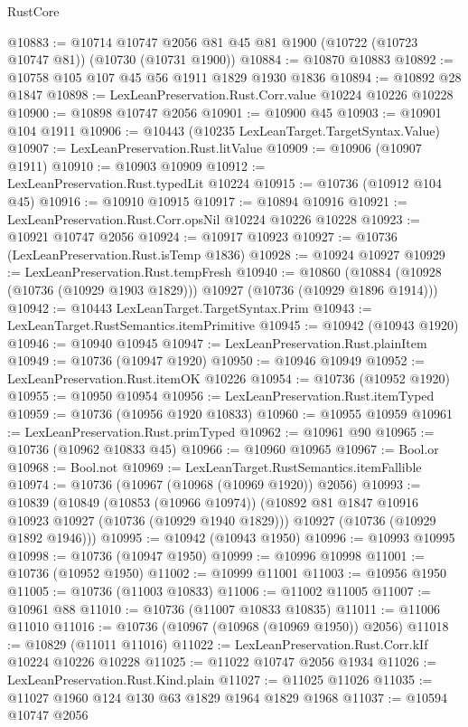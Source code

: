 \begin{lexlean}{RustCore}
\begin{coremodule}
@10883 := @10714 @10747 @2056 @81 @45 @81 @1900 (@10722 (@10723 @10747 @81)) (@10730 (@10731 @1900))
@10884 := @10870 @10883
@10892 := @10758 @105 @107 @45 @56 @1911 @1829 @1930 @1836
@10894 := @10892 @28 @1847
@10898 := LexLeanPreservation.Rust.Corr.value @10224 @10226 @10228
@10900 := @10898 @10747 @2056
@10901 := @10900 @45
@10903 := @10901 @104 @1911
@10906 := @10443 (@10235 LexLeanTarget.TargetSyntax.Value)
@10907 := LexLeanPreservation.Rust.litValue
@10909 := @10906 (@10907 @1911)
@10910 := @10903 @10909
@10912 := LexLeanPreservation.Rust.typedLit @10224
@10915 := @10736 (@10912 @104 @45)
@10916 := @10910 @10915
@10917 := @10894 @10916
@10921 := LexLeanPreservation.Rust.Corr.opsNil @10224 @10226 @10228
@10923 := @10921 @10747 @2056
@10924 := @10917 @10923
@10927 := @10736 (LexLeanPreservation.Rust.isTemp @1836)
@10928 := @10924 @10927
@10929 := LexLeanPreservation.Rust.tempFresh
@10940 := @10860
    (@10884 (@10928 (@10736 (@10929 @1903 @1829))) @10927 (@10736 (@10929 @1896 @1914)))
@10942 := @10443 LexLeanTarget.TargetSyntax.Prim
@10943 := LexLeanTarget.RustSemantics.itemPrimitive
@10945 := @10942 (@10943 @1920)
@10946 := @10940 @10945
@10947 := LexLeanPreservation.Rust.plainItem
@10949 := @10736 (@10947 @1920)
@10950 := @10946 @10949
@10952 := LexLeanPreservation.Rust.itemOK @10226
@10954 := @10736 (@10952 @1920)
@10955 := @10950 @10954
@10956 := LexLeanPreservation.Rust.itemTyped
@10959 := @10736 (@10956 @1920 @10833)
@10960 := @10955 @10959
@10961 := LexLeanPreservation.Rust.primTyped
@10962 := @10961 @90
@10965 := @10736 (@10962 @10833 @45)
@10966 := @10960 @10965
@10967 := Bool.or
@10968 := Bool.not
@10969 := LexLeanTarget.RustSemantics.itemFallible
@10974 := @10736 (@10967 (@10968 (@10969 @1920)) @2056)
@10993 := @10839
    (@10849
      (@10853 (@10966 @10974))
      (@10892 @81 @1847 @10916 @10923 @10927 (@10736 (@10929 @1940 @1829)))
      @10927
      (@10736 (@10929 @1892 @1946)))
@10995 := @10942 (@10943 @1950)
@10996 := @10993 @10995
@10998 := @10736 (@10947 @1950)
@10999 := @10996 @10998
@11001 := @10736 (@10952 @1950)
@11002 := @10999 @11001
@11003 := @10956 @1950
@11005 := @10736 (@11003 @10833)
@11006 := @11002 @11005
@11007 := @10961 @88
@11010 := @10736 (@11007 @10833 @10835)
@11011 := @11006 @11010
@11016 := @10736 (@10967 (@10968 (@10969 @1950)) @2056)
@11018 := @10829 (@11011 @11016)
@11022 := LexLeanPreservation.Rust.Corr.kIf @10224 @10226 @10228
@11025 := @11022 @10747 @2056 @1934
@11026 := LexLeanPreservation.Rust.Kind.plain
@11027 := @11025 @11026
@11035 := @11027 @1960 @124 @130 @63 @1829 @1964 @1829 @1968
@11037 := @10594 @10747 @2056

\end{coremodule}
\end{lexlean}
